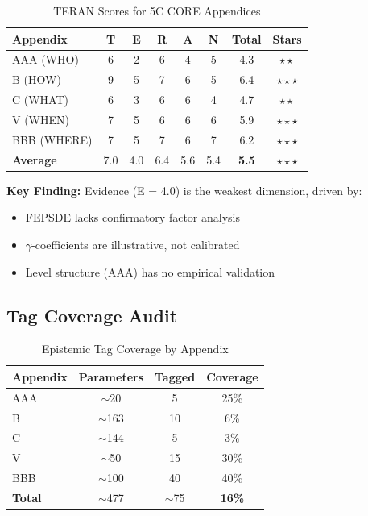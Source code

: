 \documentclass[11pt,a4paper]{article}
\begin{document}
\begin{table}[h]
\centering
\caption{TERAN Scores for 5C CORE Appendices}
\label{tab:assessment}
\begin{tabular}{lccccccc}
\toprule
\textbf{Appendix} & \textbf{T} & \textbf{E} & \textbf{R} & \textbf{A} & \textbf{N} & \textbf{Total} & \textbf{Stars} \\
\midrule
AAA (WHO) & 6 & 2 & 6 & 4 & 5 & 4.3 & $\star\star$ \\
B (HOW) & 9 & 5 & 7 & 6 & 5 & 6.4 & $\star\star\star$ \\
C (WHAT) & 6 & 3 & 6 & 6 & 4 & 4.7 & $\star\star$ \\
V (WHEN) & 7 & 5 & 6 & 6 & 6 & 5.9 & $\star\star\star$ \\
BBB (WHERE) & 7 & 5 & 7 & 6 & 7 & 6.2 & $\star\star\star$ \\
\midrule
\textbf{Average} & 7.0 & 4.0 & 6.4 & 5.6 & 5.4 & \textbf{5.5} & $\star\star\star$ \\
\bottomrule
\end{tabular}
\end{table}

\textbf{Key Finding:} Evidence (E = 4.0) is the weakest dimension, driven by:
\begin{itemize}
    \item FEPSDE lacks confirmatory factor analysis
    \item $\gamma$-coefficients are illustrative, not calibrated
    \item Level structure (AAA) has no empirical validation
\end{itemize}

\subsection{Tag Coverage Audit}

\begin{table}[h]
\centering
\caption{Epistemic Tag Coverage by Appendix}
\begin{tabular}{lccc}
\toprule
\textbf{Appendix} & \textbf{Parameters} & \textbf{Tagged} & \textbf{Coverage} \\
\midrule
AAA & $\sim$20 & 5 & 25\% \\
B & $\sim$163 & 10 & 6\% \\
C & $\sim$144 & 5 & 3\% \\
V & $\sim$50 & 15 & 30\% \\
BBB & $\sim$100 & 40 & 40\% \\
\midrule
\textbf{Total} & $\sim$477 & $\sim$75 & \textbf{16\%} \\
\bottomrule
\end{tabular}
\end{table}
\end{document}
